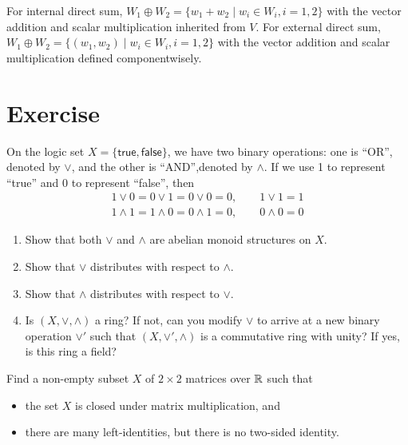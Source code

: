 For internal direct sum, $W_1 \oplus W_2 = \{ w_1 + w_2 \mid w_i \in W_i, i = 1, 2 \}$ with the vector addition and scalar multiplication inherited from $V$. For external direct sum, $W_1 \oplus W_2 = \{ (w_1, w_2) \mid w_i \in W_i, i = 1, 2 \}$ with the vector addition and scalar multiplication defined componentwisely.

\clearpage{}

\section{Exercise}

\begin{problem}
  On the logic set $X = \{\mathsf{true}, \mathsf{false}\}$, we have two binary operations: one is ``OR'', denoted by $\lor$, and the other is ``AND'',denoted by $\land$. If we use 1 to represent ``true'' and 0 to represent ``false'', then
  \begin{align*}
    1 \lor 0 = 0 \lor 1 = 0 \lor 0 = 0, \qquad 1 \lor 1 = 1 \\
    1 \land 1 = 1 \land 0 = 0 \land 1 = 0, \qquad 0 \land 0 = 0
  \end{align*}
  \begin{enumerate}
    \item Show that both $\lor$ and $\land$ are abelian monoid structures on $X$.
    \item Show that $\lor$ distributes with respect to $\land$.
    \item Show that $\land$ distributes with respect to $\lor$.
    \item Is $(X, \lor, \land)$ a ring? If not, can you modify $\lor$ to arrive at a new binary operation $\lor'$ such that $(X, \lor', \land)$ is a commutative ring with unity? If yes, is this ring a field?
  \end{enumerate}
\end{problem}

\begin{problem}
  Find a non-empty subset $X$ of $2 \times 2$ matrices over $\operatorname{\mathbb{R}}$ such that 
  \begin{itemize}
    \item the set $X$ is closed under matrix multiplication, and 
    \item there are many left-identities, but there is no two-sided identity.
  \end{itemize}
\end{problem}

